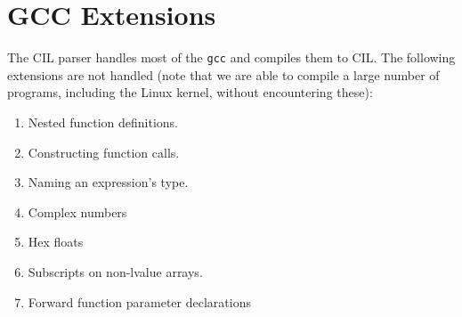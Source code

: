 \documentclass{article}
\def\t#1{{\tt #1}}
\begin{document}
\section{GCC Extensions}

 The CIL parser handles most of the \t{gcc}
and compiles them to CIL. The following extensions are not handled (note that
we are able to compile a large number of programs, including the Linux kernel,
without encountering these):

\begin{enumerate}
\item Nested function definitions.
\item Constructing function calls.
\item Naming an expression's type.
\item Complex numbers
\item Hex floats
\item Subscripts on non-lvalue arrays.
\item Forward function parameter declarations
\end{enumerate}
\end{document}

